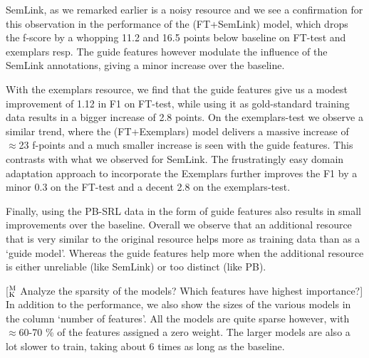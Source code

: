 \documentclass[11pt,a4paper]{article}
\newcommand{\ensuretext}[1]{#1}
\newcommand{\mkmarker}{\ensuretext{\textcolor{mdgreen}{\ensuremath{^{\textsc{M}}_{\textsc{K}}}}}}
\newcommand{\arkcomment}[3]{\ensuretext{\textcolor{#3}{[#1 #2]}}}
\newcommand{\mk}[1]{\arkcomment{\mkmarker}{#1}{mdgreen}}
\begin{document}
SemLink, as we remarked earlier is a noisy resource and we see a confirmation for this observation in the performance of the (FT+SemLink) model,
which drops the f-score by a whopping 11.2 and 16.5 points below baseline on FT-test and exemplars resp. The guide features however modulate the influence
of the SemLink annotations, giving a minor increase over the baseline. 

With the exemplars resource, we find that the guide features give us a modest improvement of 1.12 in F1 on FT-test, 
while using it as gold-standard training data results in a bigger increase of 2.8 points. 
On the exemplars-test we observe a similar trend, where the (FT+Exemplars) model delivers a massive increase of $\approx$23 f-points and a 
much smaller increase is seen with the guide features. This contrasts with what we observed for SemLink.
The frustratingly easy domain adaptation approach to incorporate the Exemplars
further improves the F1 by a minor 0.3 on the FT-test and a decent 2.8 on the exemplars-test.

Finally, using the PB-SRL data in the form of guide features also results in small improvements over the baseline. Overall we observe that an
additional resource that is very similar to the original resource helps more as training data than as a `guide model'.
Whereas the guide features help more when the additional resource is either unreliable (like SemLink) or too distinct (like PB). 

\mk{Analyze the sparsity of the models? Which features have highest importance?}
In addition to the performance, we also show the sizes of the various models in the column `number of features'. All the models are quite sparse however,
with $\approx$60-70 \% of the features assigned a zero weight. The larger models are also a lot slower to train, taking about 6 times
as long as the baseline. 
\end{document}
